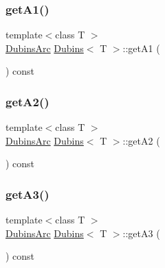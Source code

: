 \mbox{\label{class_dubins_af21928e1891ba40fd036af507a67b0bb}} 
\subsubsection{\texorpdfstring{getA1()}{getA1()}}
{\footnotesize\ttfamily template$<$class T $>$ \\
\mbox{\hyperlink{class_dubins_arc}{Dubins\+Arc}} \mbox{\hyperlink{class_dubins}{Dubins}}$<$ T $>$\+::get\+A1 (\begin{DoxyParamCaption}{ }\end{DoxyParamCaption}) const\hspace{0.3cm}{\ttfamily [inline]}}

\mbox{\label{class_dubins_a5157eff5ac184488b43cf9933cab6479}} 
\subsubsection{\texorpdfstring{getA2()}{getA2()}}
{\footnotesize\ttfamily template$<$class T $>$ \\
\mbox{\hyperlink{class_dubins_arc}{Dubins\+Arc}} \mbox{\hyperlink{class_dubins}{Dubins}}$<$ T $>$\+::get\+A2 (\begin{DoxyParamCaption}{ }\end{DoxyParamCaption}) const\hspace{0.3cm}{\ttfamily [inline]}}

\mbox{\label{class_dubins_ad0bddc489338c85901221e8c0c5dd638}} 
\subsubsection{\texorpdfstring{getA3()}{getA3()}}
{\footnotesize\ttfamily template$<$class T $>$ \\
\mbox{\hyperlink{class_dubins_arc}{Dubins\+Arc}} \mbox{\hyperlink{class_dubins}{Dubins}}$<$ T $>$\+::get\+A3 (\begin{DoxyParamCaption}{ }\end{DoxyParamCaption}) const\hspace{0.3cm}{\ttfamily [inline]}}

